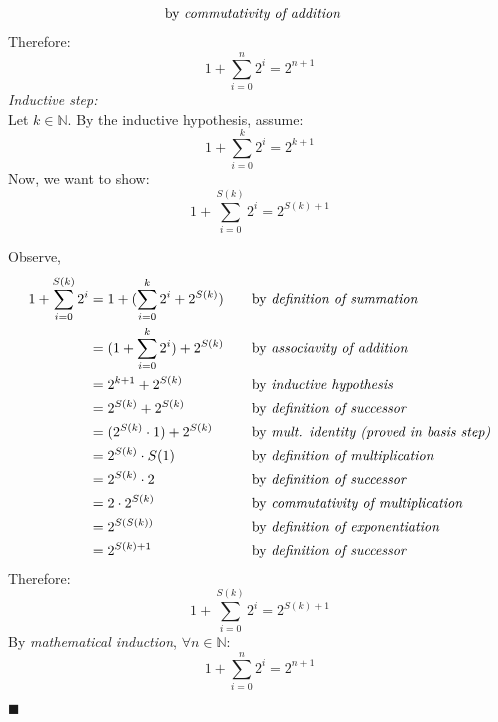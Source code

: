 \documentclass[11pt,a4paper]{article}
\begin{document}
\begin{enumerate}
\begin{align*}
                &\text{by \emph{commutativity of addition}}
    \end{align*}
    Therefore:
    \begin{equation*}
        1 + \sum_{i = 0}^{n} 2^i = 2^{n + 1}
    \end{equation*}
    \emph{Inductive step:} \\
    Let $k \in \mathbb{N} $. By the inductive hypothesis, assume:
    \begin{equation*}
        1 + \sum_{i = 0}^{k} 2^i = 2^{k + 1}
    \end{equation*}
    Now, we want to show: 
    \begin{equation*}
        1 + \sum_{i = 0}^{S(k)} 2^i = 2^{S(k) + 1}
    \end{equation*}

    Observe, 
    \begin{align*}
        1 + \sum_{i = 0}^{S(k)} 2^i
            &=  1 + (\sum_{i = 0}^{k} 2^i + 2^{S(k)})
                &\quad
                &\text{by \emph{definition of summation}} \\
            &=  (1 + \sum_{i = 0}^{k} 2^i) + 2^{S(k)}
                &\quad
                &\text{by \emph{associavity of addition}} \\
            &= 2^{k + 1} + 2^{S(k)}
                &\quad
                &\text{by \emph{inductive hypothesis}} \\
            &= 2^{S(k)} + 2^{S(k)}
                &\quad
                &\text{by \emph{definition of successor}} \\
            &= (2^{S(k)} \cdot 1) + 2^{S(k)}
                &\quad
                &\text{by \emph{mult. identity (proved in basis step)}} \\
            &= 2^{S(k)} \cdot S(1)
                &\quad
                &\text{by \emph{definition of multiplication}} \\
            &= 2^{S(k)} \cdot 2
                &\quad
                &\text{by \emph{definition of successor}} \\
            &= 2 \cdot 2^{S(k)}
                &\quad
                &\text{by \emph{commutativity of multiplication}} \\
            &= 2^{S(S(k))}
                &\quad
                &\text{by \emph{definition of exponentiation}} \\
            &= 2^{S(k) + 1}
                &\quad
                &\text{by \emph{definition of successor}}
    \end{align*}
    Therefore: 
    \begin{equation*}
        1 + \sum_{i = 0}^{S(k)} 2^i = 2^{S(k) + 1}
    \end{equation*}
    By \emph{mathematical induction}, $\forall n \in \mathbb{N} $:
    \begin{equation*}
        1 + \sum_{i = 0}^{n} 2^i = 2^{n + 1}
    \end{equation*}
    \begin{flushright}
        $\blacksquare$
    \end{flushright}


\end{enumerate}
\end{document}
